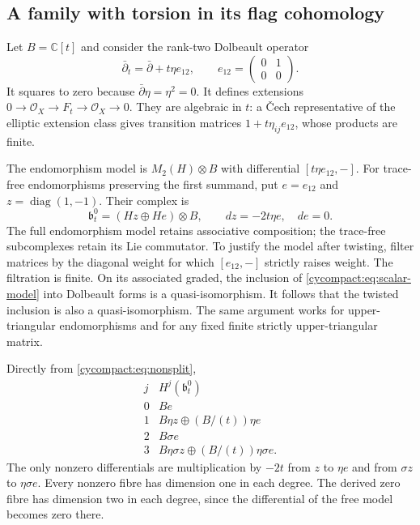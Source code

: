 \subsection{A family with torsion in its flag cohomology}

Let $B=\mathbb C[t]$ and consider the rank-two Dolbeault operator
\[
 \bar\partial_t=\bar\partial+t\eta e_{12},\qquad
 e_{12}=\begin{pmatrix}0&1\\0&0\end{pmatrix}.
\]
It squares to zero because $\bar\partial\eta=\eta^2=0$.
It defines extensions
$0\to\mathcal O_X\to F_t\to\mathcal O_X\to0$.
They are algebraic in $t$: a \v{C}ech representative of the
elliptic extension class gives transition matrices
$1+t\eta_{ij}e_{12}$, whose products are finite.

The endomorphism model is
$M_2(H)\otimes B$ with differential $[t\eta e_{12},-]$.
For trace-free endomorphisms preserving the first summand, put
$e=e_{12}$ and $z=\operatorname{diag}(1,-1)$. Their complex is
\begin{equation}\label{cycompact:eq:nonsplit}
 \mathfrak b_t^0=(Hz\oplus He)\otimes B,
 \qquad dz=-2t\eta e,\quad de=0.
\end{equation}
The full endomorphism model retains associative composition;
the trace-free subcomplexes retain its Lie commutator.
To justify the model after twisting, filter matrices by the
diagonal weight for which $[e_{12},-]$ strictly raises weight.
The filtration is finite. On its associated graded, the
inclusion of \eqref{cycompact:eq:scalar-model} into Dolbeault
forms is a quasi-isomorphism. It follows that the twisted
inclusion is also a quasi-isomorphism. The same argument works
for upper-triangular endomorphisms and for any fixed finite
strictly upper-triangular matrix.

Directly from \eqref{cycompact:eq:nonsplit},
\begin{equation}\label{cycompact:eq:nonsplit-cohomology}
\begin{array}{c|c}
 j&H^j(\mathfrak b_t^0)\\\hline
 0&Be\\
 1&B\eta z\oplus(B/(t))\eta e\\
 2&B\sigma e\\
 3&B\eta\sigma z\oplus(B/(t))\eta\sigma e.
\end{array}
\end{equation}
The only nonzero differentials are multiplication by $-2t$
from $z$ to $\eta e$ and from $\sigma z$ to $\eta\sigma e$.
Every nonzero fibre has dimension one in each degree. The
derived zero fibre has dimension two in each degree, since
the differential of the free model becomes zero there.

